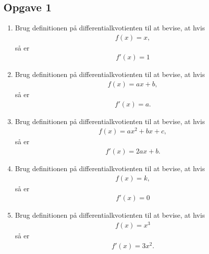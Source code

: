 \subsection*{Opgave 1}
\begin{enumerate}[label=\roman*)]
	\item Brug definitionen på differentialkvotienten til at bevise, at hvis 
	\begin{align*}
		f(x) = x,
	\end{align*}
	så er
	\begin{align*}
		f'(x) = 1
	\end{align*}	 
	\item Brug definitionen på differentialkvotienten til at bevise, at hvis 
	\begin{align*}
		f(x) = ax + b,
	\end{align*}		
	så er 
	\begin{align*}
		f'(x) = a.
	\end{align*}
	\item Brug definitionen på differentialkvotienten til at bevise, at hvis
	\begin{align*}
		f(x) = ax^2 + bx + c,
	\end{align*}	
	så er 
	\begin{align*}
		f'(x) = 	2ax + b.
	\end{align*}		
	\item Brug definitionen på differentialkvotienten til at bevise, at hvis
	\begin{align*}
		f(x) = k,
	\end{align*}
	så er 
	\begin{align*}
		f'(x) = 0
	\end{align*}
	\item Brug definitionen på differentialkvotienten til at bevise, at hvis
	\begin{align*}
		f(x) = x^3
	\end{align*}
	så er 
	\begin{align*}
		f'(x) = 3x^2.
	\end{align*}
\end{enumerate}